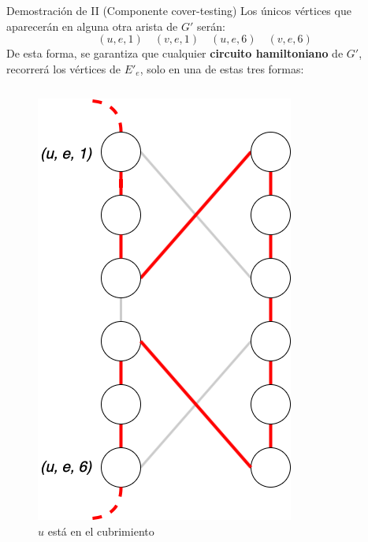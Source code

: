 \documentclass{beamer}
\begin{document}
\begin{frame}{Demostración de II (Componente cover-testing)}
    Los únicos vértices que aparecerán en alguna otra arista de $G'$ serán:
    \[(u,e,1) \quad (v,e,1) \quad (u,e,6) \quad (v,e,6)\]
    De esta forma, se garantiza que cualquier \textbf{circuito hamiltoniano} de $G'$,
    recorrerá los vértices de $E'_e$, solo en una de estas tres formas:
    \begin{columns}
        \begin{figure}
            \centering
            \includegraphics[scale=0.2]{images/cover-testing-3.png}
            \caption{$u$ está en el cubrimiento}
            \label{fig:my_label}
        \end{figure}


\end{columns}
\end{frame}
\end{document}
